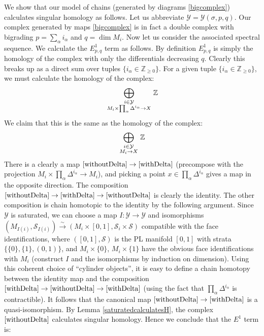 \documentclass[12pt]{article}
\theoremstyle{definition}
\theoremstyle{remark}
\numberwithin{equation}{subsection}
\newcommand{\Y}{\mathcal Y}
\newcommand{\ZZ}{\mathbb Z}
\newcommand{\SSS}{\mathcal S}
\begin{document}
We show that our model of chains (generated by diagrams \eqref{bigcomplex}) calculates singular homology as follows.  Let us abbreviate $\Y=\Y(\sigma,p,q)$.  Our complex generated by maps \eqref{bigcomplex} is in fact a double complex with bigrading $p=\sum_\alpha i_\alpha$ and $q=\dim M_i$.  Now let us consider the associated spectral sequence.  We calculate the $E^1_{p,q}$ term as follows.  By definition $E^1_{p,q}$ is simply the homology of the complex with only the differentials decreasing $q$.  Clearly this breaks up as a direct sum over tuples $\{i_\alpha\in\ZZ_{\geq 0}\}$.  For a given tuple $\{i_\alpha\in\ZZ_{\geq 0}\}$, we must calculate the homology of the complex:
\begin{equation}\label{withDelta}
\bigoplus_{\begin{smallmatrix}i\in\Y\cr M_i\times\prod_\alpha\Delta^{i_\alpha}\to X\end{smallmatrix}}\ZZ
\end{equation}
We claim that this is the same as the homology of the complex:
\begin{equation}\label{withoutDelta}
\bigoplus_{\begin{smallmatrix}i\in\Y\cr M_i\to X\end{smallmatrix}}\ZZ
\end{equation}
There is a clearly a map $\eqref{withoutDelta}\to\eqref{withDelta}$ (precompose with the projection $M_i\times\prod_\alpha\Delta^{i_\alpha}\to M_i$), and picking a point $x\in\prod_\alpha\Delta^{i_\alpha}$ gives a map in the opposite direction.  The composition $\eqref{withoutDelta}\to\eqref{withDelta}\to\eqref{withoutDelta}$ is clearly the identity.  The other composition is chain homotopic to the identity by the following argument.  Since $\Y$ is saturated, we can choose a map $I:\Y\to\Y$ and isomorphisms $(M_{I(i)},\SSS_{I(i)})\xrightarrow\sim(M_i\times[0,1],\SSS_i\times\SSS)$ compatible with the face identifications, where $([0,1],\SSS)$ is the PL manifold $[0,1]$ with strata $\{\{0\},\{1\},(0,1)\}$, and $M_i\times\{0\}$, $M_i\times\{1\}$ have the obvious face identifications with $M_i$ (construct $I$ and the isomorphisms by induction on dimension).  Using this coherent choice of ``cylinder objects'', it is easy to define a chain homotopy between the identity map and the composition $\eqref{withDelta}\to\eqref{withoutDelta}\to\eqref{withDelta}$ (using the fact that $\prod_\alpha\Delta^{i_\alpha}$ is contractible).  It follows that the canonical map $\eqref{withoutDelta}\to\eqref{withDelta}$ is a quasi-isomorphism.  By Lemma \ref{saturatedcalculatesH}, the complex $\eqref{withoutDelta}$ calculates singular homology.  Hence we conclude that the $E^1$ term is:
\end{document}
